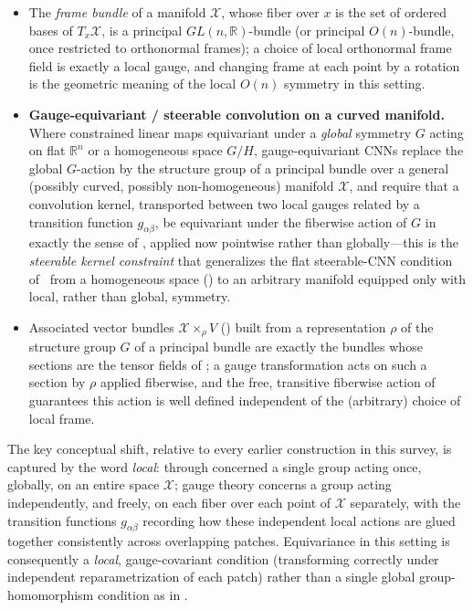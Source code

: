 \documentclass[mathematics,review,submit,moreauthors]{Definitions/mdpi}
\begin{document}
\begin{Example}
\label{ex:principal-bundles-learning}
\begin{itemize}
    \item The \emph{frame bundle} of a manifold $\mathcal{X}$, whose fiber over $x$ is
    the set of ordered bases of $T_x\mathcal{X}$, is a principal $GL(n,\mathbb{R})$-bundle
    (or principal $O(n)$-bundle, once restricted to orthonormal frames); a
    choice of local orthonormal frame field is exactly a local gauge, and
    changing frame at each point by a rotation is the geometric meaning of
    the local $O(n)$ symmetry in this setting.
    \item \textbf{Gauge-equivariant / steerable convolution on a curved
    manifold.} Where  constrained
    linear maps equivariant under a \emph{global} symmetry $G$ acting on
    flat $\mathbb{R}^n$ or a homogeneous space $G/H$, gauge-equivariant CNNs
    replace the global $G$-action by the structure group of a principal
    bundle over a general (possibly curved, possibly non-homogeneous)
    manifold $\mathcal{X}$, and require that a convolution kernel, transported between
    two local gauges related by a transition function $g_{\alpha\beta}$, be
    equivariant under the fiberwise action of $G$ in exactly the sense of
    , applied now pointwise rather than
    globally---this is the \emph{steerable kernel constraint} that
    generalizes the flat steerable-CNN condition of~\citep{weiler2019anips}
    from a homogeneous space () to an
    arbitrary manifold equipped only with local, rather than global,
    symmetry.
    \item Associated vector bundles $\mathcal{X} \times_\rho V$
    () built from a representation $\rho$
    of the structure group $G$ of a principal bundle are exactly the
    bundles whose sections are the tensor fields of
    ; a gauge transformation acts on such a
    section by $\rho$ applied fiberwise, and the free, transitive fiberwise
    action of  guarantees this action
    is well defined independent of the (arbitrary) choice of local frame.
\end{itemize}
\end{Example}

The key conceptual shift, relative to every earlier construction in this
survey, is captured by the word \emph{local}: 
through  concerned a single group acting
once, globally, on an entire space $\mathcal{X}$; gauge theory concerns a group acting
independently, and freely, on each fiber over each point of $\mathcal{X}$
separately, with the transition functions $g_{\alpha\beta}$ recording how
these independent local actions are glued together consistently across
overlapping patches. Equivariance in this setting is consequently a
\emph{local}, gauge-covariant condition (transforming correctly under
independent reparametrization of each patch) rather than a single global
group-homomorphism condition as in .
\end{document}
